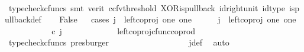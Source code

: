 \begin{isabellebody}
\ \ \ \ \isamarkupfalse%
\ {\isacharparenleft}{\kern0pt}typecheck{\isacharunderscore}{\kern0pt}cfuncs{\isacharcomma}{\kern0pt}\ smt\ {\isacharparenleft}{\kern0pt}verit{\isacharcomma}{\kern0pt}\ ccfv{\isacharunderscore}{\kern0pt}threshold{\isacharparenright}{\kern0pt}\ XOR{\isacharunderscore}{\kern0pt}is{\isacharunderscore}{\kern0pt}pullback\ id{\isacharunderscore}{\kern0pt}right{\isacharunderscore}{\kern0pt}unit{}\ id{\isacharunderscore}{\kern0pt}type\ is{\isacharunderscore}{\kern0pt}pullback{\isacharunderscore}{\kern0pt}def{\isacharparenright}{\kern0pt}\isanewline
\ \ \isamarkupfalse%
\ False\isanewline
\ \ \isamarkupfalse%
{\isacharparenleft}{\kern0pt}cases\ {\isachardoublequoteopen}j\ {\isacharequal}{\kern0pt}\ left{\isacharunderscore}{\kern0pt}coproj\ one\ one{\isachardoublequoteclose}{\isacharparenright}{\kern0pt}\isanewline
\ \ \ \ \isamarkupfalse%
\ {\isachardoublequoteopen}j\ {\isacharequal}{\kern0pt}\ left{\isacharunderscore}{\kern0pt}coproj\ one\ one{\isachardoublequoteclose}\isanewline
\ \ \ \ \isamarkupfalse%
\ \isamarkupfalse%
\ {\isachardoublequoteopen}{\isacharparenleft}{\kern0pt}{\isasymlangle}{\isasymt}{\isacharcomma}{\kern0pt}\ {\isasymf}{\isasymrangle}\ {\isasymamalg}{\isasymlangle}{\isasymf}{\isacharcomma}{\kern0pt}\ {\isasymt}{\isasymrangle}{\isacharparenright}{\kern0pt}\ {\isasymcirc}\isactrlsub c\ j\ \ {\isacharequal}{\kern0pt}\ {\isasymlangle}{\isasymt}{\isacharcomma}{\kern0pt}\ {\isasymf}{\isasymrangle}{\isachardoublequoteclose}\isanewline
\ \ \ \ \ \ \isamarkupfalse%
\ \ left{\isacharunderscore}{\kern0pt}coproj{\isacharunderscore}{\kern0pt}cfunc{\isacharunderscore}{\kern0pt}coprod\ \isamarkupfalse%
\ {\isacharparenleft}{\kern0pt}typecheck{\isacharunderscore}{\kern0pt}cfuncs{\isacharcomma}{\kern0pt}\ presburger{\isacharparenright}{\kern0pt}\isanewline
\ \ \ \ \isamarkupfalse%
\ \isamarkupfalse%
\ {\isachardoublequoteopen}{\isasymlangle}{\isasymt}{\isacharcomma}{\kern0pt}\ {\isasymf}{\isasymrangle}\ {\isacharequal}{\kern0pt}\ {\isasymlangle}{\isasymf}{\isacharcomma}{\kern0pt}{\isasymf}{\isasymrangle}{\isachardoublequoteclose}\isanewline
\ \ \ \ \ \ \isamarkupfalse%
\ j{\isacharunderscore}{\kern0pt}def\ \isamarkupfalse%
\ auto\isanewline
\ \ \ \ \isamarkupfalse%
\ \isamarkupfalse%
\ {\isachardoublequoteopen}{\isasymt}\ {\isacharequal}{\kern0pt}\ {\isasymf}{\isachardoublequoteclose}\isanewline

\end{isabellebody}
